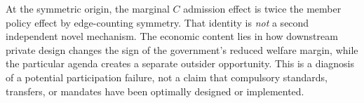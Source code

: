 At the symmetric origin, the marginal $C$ admission
effect is twice the member policy effect by
edge-counting symmetry. That identity is \emph{not}
a second independent novel mechanism. The economic
content lies in how downstream private design changes
the sign of the government's reduced welfare margin,
while the particular agenda creates a separate outsider
opportunity. This is a diagnosis of a potential
participation failure, not a claim that compulsory
standards, transfers, or mandates have been optimally
designed or implemented.
